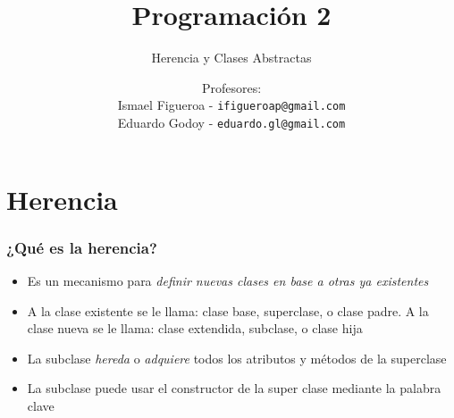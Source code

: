 \documentclass{beamer}
\title[\textbf{Programación 2}]{\textbf{Programación 2}}
\subtitle{Herencia y Clases Abstractas}
\author[IF-EG]
{Profesores:\\
  Ismael Figueroa -  \texttt{\small ifigueroap@gmail.com} \\
  \vspace{0.5mm}
  Eduardo Godoy - \texttt{\small eduardo.gl@gmail.com}
}
\institute[Universidad de Valparaíso]
\date{}
\begin{document}
\begin{frame}
  \titlepage  
\end{frame}

\section{Herencia}

\begin{frame}
  \frametitle{¿Qué es la herencia?}
  \begin{itemize}
  \item Es un mecanismo para \emph{definir nuevas clases en base a
      otras ya existentes}
    
  \item A la clase existente se le llama: clase base, superclase, o
    clase padre. A la clase nueva se le llama: clase extendida,
    subclase, o clase hija
    
  \item La subclase \emph{hereda} o \emph{adquiere} todos los
    atributos y métodos de la superclase
    
  \item La subclase puede usar el constructor de la super clase
    mediante la palabra clave 
    
  \end{itemize}
\end{frame}
\end{document}
